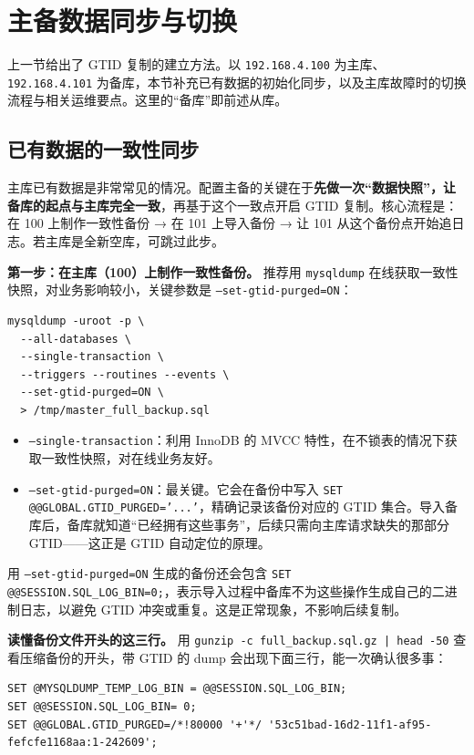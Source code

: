 \documentclass[12pt,UTF8]{ctexbook}
\begin{document}
\section{主备数据同步与切换}
\label{sec:master-standby-failover}

上一节给出了 GTID 复制的建立方法。以 \texttt{192.168.4.100} 为主库、\texttt{192.168.4.101} 为备库，本节补充已有数据的初始化同步，以及主库故障时的切换流程与相关运维要点。这里的“备库”即前述从库。

\subsection{已有数据的一致性同步}

主库已有数据是非常常见的情况。配置主备的关键在于\textbf{先做一次“数据快照”，让备库的起点与主库完全一致}，再基于这个一致点开启 GTID 复制。核心流程是：在 100 上制作一致性备份 → 在 101 上导入备份 → 让 101 从这个备份点开始追日志。若主库是全新空库，可跳过此步。

\textbf{第一步：在主库（100）上制作一致性备份。} 推荐用 \texttt{mysqldump} 在线获取一致性快照，对业务影响较小，关键参数是 \texttt{--set-gtid-purged=ON}：

\begin{lstlisting}
mysqldump -uroot -p \
  --all-databases \
  --single-transaction \
  --triggers --routines --events \
  --set-gtid-purged=ON \
  > /tmp/master_full_backup.sql
\end{lstlisting}

\begin{itemize}[leftmargin=2cm]
  \item \texttt{--single-transaction}：利用 InnoDB 的 MVCC 特性，在不锁表的情况下获取一致性快照，对在线业务友好。
  \item \texttt{--set-gtid-purged=ON}：最关键。它会在备份中写入 \texttt{SET @@GLOBAL.GTID\_PURGED='...'}，精确记录该备份对应的 GTID 集合。导入备库后，备库就知道“已经拥有这些事务”，后续只需向主库请求缺失的那部分 GTID——这正是 GTID 自动定位的原理。
\end{itemize}

用 \texttt{--set-gtid-purged=ON} 生成的备份还会包含 \texttt{SET @@SESSION.SQL\_LOG\_BIN=0;}，表示导入过程中备库不为这些操作生成自己的二进制日志，以避免 GTID 冲突或重复。这是正常现象，不影响后续复制。

\textbf{读懂备份文件开头的这三行。} 用 \texttt{gunzip -c full\_backup.sql.gz | head -50} 查看压缩备份的开头，带 GTID 的 dump 会出现下面三行，能一次确认很多事：

\begin{lstlisting}
SET @MYSQLDUMP_TEMP_LOG_BIN = @@SESSION.SQL_LOG_BIN;
SET @@SESSION.SQL_LOG_BIN= 0;
SET @@GLOBAL.GTID_PURGED=/*!80000 '+'*/ '53c51bad-16d2-11f1-af95-fefcfe1168aa:1-242609';
\end{lstlisting}
\end{document}
